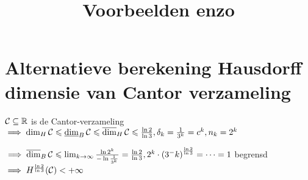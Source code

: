 \documentclass[11pt,a4paper,fleqn]{article}
\title{Voorbeelden enzo}
\begin{document}
\maketitle

\section{Alternatieve berekening Hausdorff dimensie van Cantor verzameling}

$\cantor \subseteq \mathbb{R}$ is de Cantor-verzameling $\implies \dim_H \cantor \leqslant \ldim_B \cantor \leqslant \udim_H \cantor \leqslant \frac{\ln 2}{\ln 3}, \hfill \delta_k = \frac{1}{3^k} = c^k, n_k = 2^k$

$\implies \udim_B \cantor \leqslant \limm[k] \frac{\ln 2^k}{-\ln \frac{1}{3^k}} = \frac{\ln 2}{\ln 3}, 2^k\cdot\left(3^-k\right)^{\frac{\ln2}{\ln3}} = \dots = 1$ begrensd $\implies H^{\frac{\ln2}{\ln3}}(\cantor) < + \infty$
\end{document}
